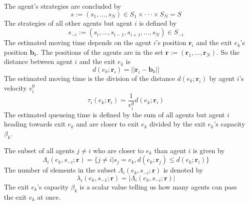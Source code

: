 The agent's strategies are concluded by \[s := (s_{1},...,s_{N}) \in S_{1}
\times \cdot\cdot\cdot \times S_{N} = S \]  The strategies of all other agents
but agent $i$ is defined by \[s_{-i} := (s_{i},...,s_{i-1},s_{i+1},...,s_{N})
\in S_{-i}\] The estimated moving time depends on the agent $i$'s position
$\mathbf{r}_i$ and the exit $e_k$'s position $\mathbf{b}_k$. The positions of
the agents are in the set $\mathbf{r} := (\mathbf{r}_1,...,\mathbf{r}_N)$. So
the distance between agent $i$ and the exit $e_k$ is \[d(e_{k};\mathbf{r}_i) =
||\mathbf{r}_i - \mathbf{b}_k||\] The estimated moving time is the division of
the distance $d(e_{k};\mathbf{r}_i)$ by agent $i$'s velocity $v^{0}_i$
\[\tau_i(e_k;\mathbf{r}_i) = \frac{1}{v^{0}_i}d(e_k;\mathbf{r}_i)\] The
estimated queueing time is defined by the sum of all agents but agent $i$
heading towards exit $e_k$ and are closer to exit $e_k$ divided by the exit
$e_k$'s capacity $\beta_k$.

The subset of all agents $j \ne i$ who are closer to $e_k$ than agent $i$ is
given by \[\Lambda_i(e_k, s_{-i};\mathbf{r}) = \{j \ne i | s_j = e_k,
d(e_k;\mathbf{r}_j) \le d(e_k;\mathbf{r}_i)\}\] The number of elements in the
subset $\Lambda_i(e_k, s_{-i};\mathbf{r})$ is denoted by
\[\lambda_i(e_k,s_{-1};\mathbf{r}) = |\Lambda_i(e_k, s_{-i};\mathbf{r})| \]
The exit $e_k$'s capacity $\beta_k$ is a scalar value telling us how many
agents can pass the exit $e_k$ at once.

